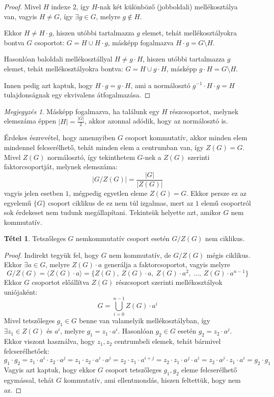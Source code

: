 \documentclass[12pt]{book}
\theoremstyle{plain} %
\theoremstyle{definition} %
\newtheorem{theo/}{Tétel}[section]
\newenvironment{theo}
  {\renewcommand{\qedsymbol}{$\clubsuit$}%
   \pushQED{\qed}\begin{theo/}}
  {\popQED\end{theo/}}
\theoremstyle{remark}
\newtheorem*{mj}{Megjegyzés}
\renewcommand\qedsymbol{$\blacksquare$}
\numberwithin{equation}{section}  %
\begin{document}
	\begin{proof}
		Mivel $H$ indexe $2$, így $H$-nak két különböző (jobboldali) mellékosztálya van, vagyis $H\neq G$, így $\exists g\in G$, melyre $g\notin H$.
		
		Ekkor $H\neq H\cdot g$, hiszen utóbbi tartalmazza $g$ elemet, tehát mellékosztályokra bontva $G$ csoportot: $G=H\cup H\cdot g$, másképp fogalmazva $H\cdot g = G\setminus H$.
		
		Hasonlóan baloldali mellékosztállyal $H \neq g\cdot H$, hiszen utóbbi tartalmazza $g$ elemet, tehát mellékosztályokra bontva: $G=H\cup g\cdot H$, másképp $g\cdot H = G\setminus H$.
		
		Innen pedig azt kaptuk, hogy $H\cdot g = g \cdot H$, ami a normálosztó $g^{-1} \cdot H \cdot g = H$ tulajdonságnak egy ekvivalens átfogalmazása.
	\end{proof}

	\begin{mj}
		Másképp fogalmazva, ha találunk egy $H$ részcsoportot, melynek elemszáma éppen $|H| = \frac{|G|}{2}$, akkor azonnal adódik, hogy az normálosztó is.
	\end{mj}

	Érdekes észrevétel, hogy amennyiben $G$ csoport kommutatív, akkor minden elem mindennel felcserélhető, tehát minden elem a centrumban van, így $Z(G) = G$. Mivel $Z(G)$ normálosztó, így tekinthetem $G$-nek a $Z(G)$ szerinti faktorcsoportját, melynek elemszáma:
	\[ |G/Z(G)| = \dfrac{|G|}{|Z(G)|}  \]
	vagyis jelen esetben $1$, mégpedig egyetlen eleme $Z(G) = G$. Ekkor persze ez az egyelemű $\{G\}$ csoport ciklikus de ez nem túl izgalmas, mert az $1$ elemű csoportról sok érdekeset nem tudunk megállapítani. Tekintsük helyette azt, amikor $G$ nem kommutatív.

	\begin{theo}\label{zgNemCikl}
		Tetszőleges $G$ nemkommutatív csoport esetén $G/Z(G)$ nem ciklikus.
	\end{theo}
	
	\begin{proof}
		Indirekt tegyük fel, hogy $G$ nem kommutatív, de $G/Z(G)$ mégis ciklikus. Ekkor $\exists a\in G$, melyre $Z(G)\cdot a$ generálja a faktorcsoportot, vagyis melyre 
		\[ G/Z(G) = \langle Z(G)\cdot a \rangle = \{Z(G),\ Z(G)\cdot a,\ Z(G) \cdot a^2,\ \ldots,\ Z(G) \cdot a^{n-1} \} \]
		Ekkor $G$ csoportot előállítva $Z(G)$ részcsoport szerinti mellékosztályok uniójaként:
		\[ G=\bigcup_{i=0}^{n-1} Z(G) \cdot a^i\]
		Mivel tetszőleges $g_1\in G$ benne van valamelyik mellékosztályban, így $\exists z_1\in Z(G)$ és $a^i$, melyre $g_1 = z_1\cdot a^i$. Hasonlóan $g_2\in G$ esetén $g_2 = z_2\cdot a^j$. Ekkor viszont használva, hogy $z_1, z_2$ centrumbeli elemek, tehát bármivel felcserélhetőek:
		\[ g_1 \cdot g_2 = z_1 \cdot a^i \cdot z_2 \cdot a^j = z_1\cdot z_2\cdot a^i \cdot a^j = z_2 \cdot z_1 \cdot a^{i+j} = z_2 \cdot z_1 \cdot a^j \cdot a^i = z_2 \cdot a^j \cdot z_1\cdot a^i = g_2 \cdot g_1  \]
		Vagyis azt kaptuk, hogy ekkor $G$ csoport tetszőleges $g_1, g_2$ eleme felcserélhető egymással, tehát $G$ kommutatív, ami ellentmondás, hiszen feltettük, hogy nem az.
	\end{proof}
	
\end{document}
